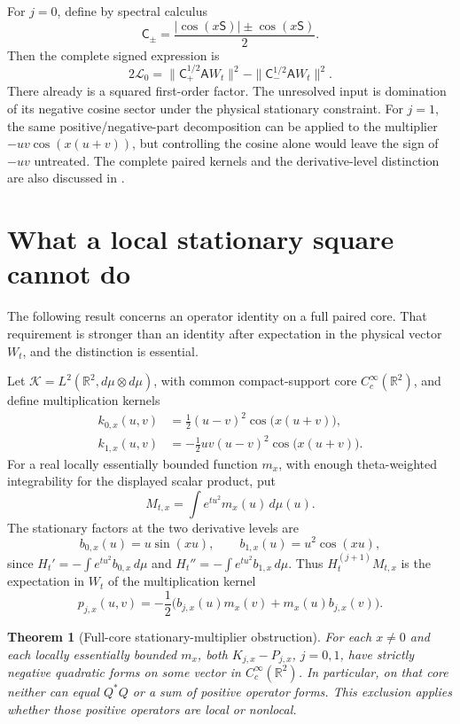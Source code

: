 \documentclass[11pt]{article}
\numberwithin{equation}{section}
\newtheorem{theorem}{Theorem}[section]
\theoremstyle{definition}
\theoremstyle{remark}
\begin{document}
For $j=0$, define by spectral calculus
\[
 \mathsf C_\pm=\frac{|\cos(x\mathsf S)|\pm\cos(x\mathsf S)}2.
\]
Then the complete signed expression is
\begin{equation}
 2\mathscr L_0
 =\|\mathsf C_+^{1/2}\mathsf A W_t\|^2
    -\|\mathsf C_-^{1/2}\mathsf A W_t\|^2.
 \label{eq:theta-cosine-sectors}
\end{equation}
There already is a squared first-order factor.  The unresolved input is
domination of its negative cosine sector under the physical stationary
constraint.  For $j=1$, the same positive/negative-part decomposition
can be applied to the multiplier $-uv\cos(x(u+v))$, but controlling
the cosine alone would leave the sign of $-uv$ untreated.  The complete
paired kernels and the derivative-level distinction are also discussed
in \cite{kernelnote,diracnote}.

\section{What a local stationary square cannot do}
\label{sec:theta-local-obstruction}

The following result concerns an operator identity on a full paired
core.  That requirement is stronger than an identity after expectation
in the physical vector $W_t$, and the distinction is essential.

Let $\mathcal K=L^2(\mathbb R^2,d\mu\otimes d\mu)$, with common
compact-support core $C_c^\infty(\mathbb R^2)$, and define multiplication
kernels
\begin{align*}
 k_{0,x}(u,v)&=\frac12(u-v)^2\cos\bigl(x(u+v)\bigr),\\
 k_{1,x}(u,v)&=-\frac12uv(u-v)^2\cos\bigl(x(u+v)\bigr).
\end{align*}
For a real locally essentially bounded function $m_x$, with enough
theta-weighted integrability for the displayed scalar product, put
\[
 M_{t,x}=\int e^{tu^2}m_x(u)\,d\mu(u).
\]
The stationary factors at the two derivative levels are
\[
 b_{0,x}(u)=u\sin(xu),\qquad
 b_{1,x}(u)=u^2\cos(xu),
\]
since $H_t'=-\int e^{tu^2}b_{0,x}\,d\mu$ and
$H_t''=-\int e^{tu^2}b_{1,x}\,d\mu$.  Thus
$H_t^{(j+1)}M_{t,x}$ is the expectation in $W_t$ of the multiplication
kernel
\begin{equation}
 p_{j,x}(u,v)=-\frac12\bigl(
       b_{j,x}(u)m_x(v)+m_x(u)b_{j,x}(v)\bigr).
 \label{eq:theta-stationary-kernel}
\end{equation}

\begin{theorem}[Full-core stationary-multiplier obstruction]
\label{thm:theta-local-no-go}
For each $x\ne0$ and each locally essentially bounded $m_x$, both
$K_{j,x}-P_{j,x}$, $j=0,1$, have strictly negative quadratic forms on
some vector in $C_c^\infty(\mathbb R^2)$.  In particular, on that core
neither can equal $Q^*Q$ or a sum of positive operator forms.  This
exclusion applies whether those positive operators are local or
nonlocal.
\end{theorem}
\end{document}
